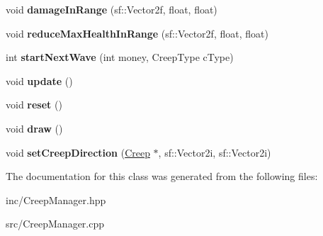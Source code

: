 \begin{DoxyCompactItemize}
\item 
\hypertarget{class_creep_manager_a2cd28be6cb75e0b645969477a5442286}{void {\bfseries damage\+In\+Range} (sf\+::\+Vector2f, float, float)}\label{class_creep_manager_a2cd28be6cb75e0b645969477a5442286}

\item 
\hypertarget{class_creep_manager_aa997e96041784a2cb3a9f3c8fad1b337}{void {\bfseries reduce\+Max\+Health\+In\+Range} (sf\+::\+Vector2f, float, float)}\label{class_creep_manager_aa997e96041784a2cb3a9f3c8fad1b337}

\item 
\hypertarget{class_creep_manager_a32c0ccc826b539b4add254f7c6fe53f6}{int {\bfseries start\+Next\+Wave} (int money, Creep\+Type c\+Type)}\label{class_creep_manager_a32c0ccc826b539b4add254f7c6fe53f6}

\item 
\hypertarget{class_creep_manager_a32006322dcbd875fe6a34946fb8f4ab7}{void {\bfseries update} ()}\label{class_creep_manager_a32006322dcbd875fe6a34946fb8f4ab7}

\item 
\hypertarget{class_creep_manager_a752e5e2941913e837da8f6cb914f1264}{void {\bfseries reset} ()}\label{class_creep_manager_a752e5e2941913e837da8f6cb914f1264}

\item 
\hypertarget{class_creep_manager_a0c358c8d07e692cc2d4d960daef882d9}{void {\bfseries draw} ()}\label{class_creep_manager_a0c358c8d07e692cc2d4d960daef882d9}

\item 
\hypertarget{class_creep_manager_a80d2187cdccccd8a2b3348aa74d9abca}{void {\bfseries set\+Creep\+Direction} (\hyperlink{class_creep}{Creep} $\ast$, sf\+::\+Vector2i, sf\+::\+Vector2i)}\label{class_creep_manager_a80d2187cdccccd8a2b3348aa74d9abca}

\end{DoxyCompactItemize}


The documentation for this class was generated from the following files\+:\begin{DoxyCompactItemize}
\item 
inc/Creep\+Manager.\+hpp\item 
src/Creep\+Manager.\+cpp\end{DoxyCompactItemize}
